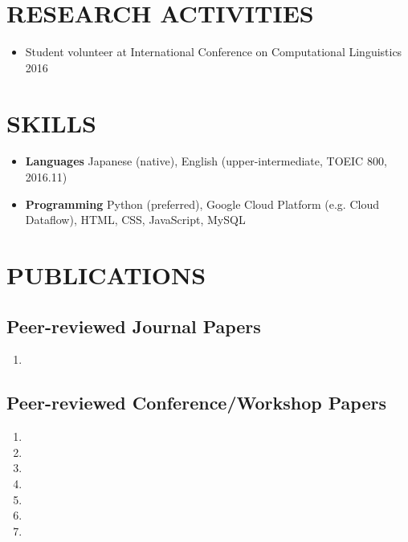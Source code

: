 \documentclass[paper=a4,fontsize=11pt]{scrartcl} %
\newcommand{\NewPart}[1]{\section*{\uppercase{#1}}}
\begin{document}
\NewPart{Research Activities}{}
\begin{itemize}[leftmargin=2em,topsep=0.5em,itemsep=0em]
    \item Student volunteer at International Conference on Computational Linguistics \hfill 2016
\end{itemize}

\NewPart{Skills}{}
\begin{itemize}[leftmargin=2em,topsep=0.5em,itemsep=0em]
    \item \textbf{Languages}\hspace{1em} Japanese (native), English (upper-intermediate, TOEIC 800, 2016.11)
    \item \textbf{Programming}\hspace{1em} Python (preferred), Google Cloud Platform (e.g. Cloud Dataflow), HTML, CSS, JavaScript, MySQL
\end{itemize}

\NewPart{Publications}{}

\subsection*{Peer-reviewed Journal Papers}
\begin{enumerate}[leftmargin=2em,topsep=0.5em,itemsep=0em]
    \item {}
\end{enumerate}

\subsection*{Peer-reviewed Conference/Workshop Papers}
\begin{enumerate}[leftmargin=2em,topsep=0.5em,itemsep=0em]
    \item {}
    \item {}
    \item {}
    \item {}
    \item {}
    \item {}
    \item {}
\end{enumerate}

\end{document}
